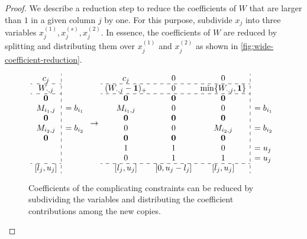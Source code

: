 \documentclass[a4paper,UKenglish,cleveref,thm-restate]{lipics-v2021}
\makeatletter
\newcommand{\veczero}{\mathbf0}
\newcommand{\vecone}{\mathbf1}
\newenvironment{cdisplaymath}{\@fleqnfalse\begin{displaymath}}{\end{displaymath}}
\makeatother
\begin{document}
\begin{proof}
    We describe a reduction step to reduce the coefficients of $W$ that are larger than $1$ in a given column $j$ by one. For this purpose, subdivide $x_j$ into three variables $x_j^{(1)},x_j^{(s)},x_j^{(2)}$. In essence, the coefficients of $W$ are reduced by splitting and distributing them over $x_j^{(1)}$ and $x_j^{(2)}$ as shown in \cref{fig:wide-coefficient-reduction}.
    \begin{figure}[H]
        \begin{cdisplaymath}
            \begin{array}{c:l}
                c_j&\\
                \cdashline{1-1}{}
                W_{\cdot,j}&\\
                \cdashline{1-1}{}
                \veczero&\\
                M_{i_1,j}&=b_{i_1}\\
                \veczero&\\
                M_{i_2,j}&=b_{i_2}\\
                \veczero&\\
                \\
                \\
                \cdashline{1-1}{}
                [l_j,u_j]&
            \end{array}
            \to
            \begin{array}{c c c:l}
                c_j&0&0\\
                \cdashline{1-3}{}
                (W_{\cdot,j}-\vecone)_+&0&\min\{W_{\cdot,j},\vecone\}\\
                \cdashline{1-3}{}
                \veczero&\veczero&\veczero\\
                M_{i_1,j}&0&0&=b_{i_1}\\
                \veczero&\veczero&\veczero\\
                0&0&M_{i_2,j}&=b_{i_2}\\
                \veczero&\veczero&\veczero\\
                1&1&0&=u_j\\
                0&1&1&=u_j\\
                \cdashline{1-3}{}
                [l_j,u_j]&[0,u_j-l_j]&[l_j,u_j]&
            \end{array}
        \end{cdisplaymath}
        \caption{Coefficients of the complicating constraints can be reduced by subdividing the variables and distributing the coefficient contributions among the new copies.}

\end{figure}
\end{proof}
\end{document}
